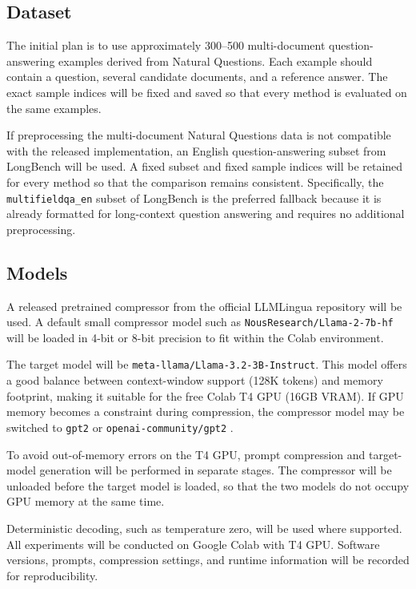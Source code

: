 \documentclass[10pt,a4paper,twocolumn]{article}
\begin{document}
\subsection{Dataset}

The initial plan is to use approximately 300--500 multi-document question-answering examples derived from Natural Questions. Each example should contain a question, several candidate documents, and a reference answer. The exact sample indices will be fixed and saved so that every method is evaluated on the same examples.

If preprocessing the multi-document Natural Questions data is not compatible with the released implementation, an English question-answering subset from LongBench will be used. A fixed subset and fixed sample indices will be retained for every method so that the comparison remains consistent. Specifically, the \texttt{multifieldqa\_en} subset of LongBench is the preferred fallback because it is already formatted for long-context question answering and requires no additional preprocessing.

\subsection{Models}

A released pretrained compressor from the official LLMLingua repository will be used. A default small compressor model such as \texttt{NousResearch/Llama-2-7b-hf} \citep{jiang-etal-2023-llmlingua} will be loaded in 4-bit or 8-bit precision to fit within the Colab environment.

The target model will be \texttt{meta-llama/Llama-3.2-3B-Instruct}. This model offers a good balance between context-window support (128K tokens) and memory footprint, making it suitable for the free Colab T4 GPU (16GB VRAM). If GPU memory becomes a constraint during compression, the compressor model may be switched to \texttt{gpt2} or \texttt{openai-community/gpt2} \citep{li-etal-2023-compressing}.

To avoid out-of-memory errors on the T4 GPU, prompt compression and target-model generation will be performed in separate stages. The compressor will be unloaded before the target model is loaded, so that the two models do not occupy GPU memory at the same time.

Deterministic decoding, such as temperature zero, will be used where supported. All experiments will be conducted on Google Colab with T4 GPU. Software versions, prompts, compression settings, and runtime information will be recorded for reproducibility.
\end{document}
